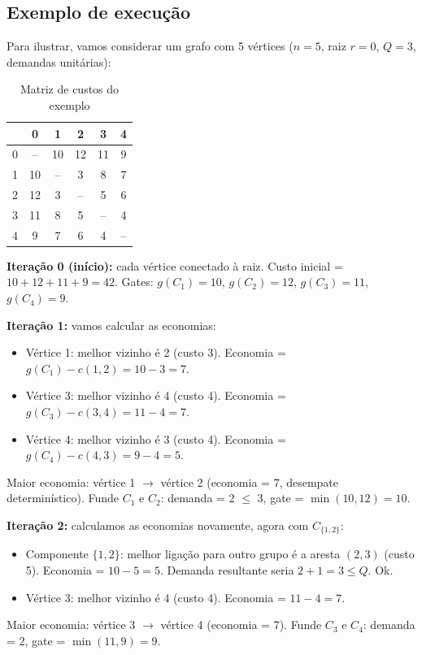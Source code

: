 \documentclass[12pt, a4paper]{article}
\begin{document}
\subsection{Exemplo de execução}

Para ilustrar, vamos considerar um grafo com 5 vértices ($n=5$, raiz $r=0$, $Q=3$, demandas unitárias):

\begin{table}[H]
\centering
\caption{Matriz de custos do exemplo}
\begin{tabular}{c|ccccc}
  & 0 & 1 & 2 & 3 & 4 \\ \hline
0 & -- & 10 & 12 & 11 & 9 \\
1 & 10 & -- & 3  & 8  & 7 \\
2 & 12 & 3  & -- & 5  & 6 \\
3 & 11 & 8  & 5  & -- & 4 \\
4 & 9  & 7  & 6  & 4  & --
\end{tabular}
\end{table}

\textbf{Iteração 0 (início):} cada vértice conectado à raiz.
Custo inicial = $10 + 12 + 11 + 9 = 42$. Gates: $g(C_1)=10$, $g(C_2)=12$, $g(C_3)=11$, $g(C_4)=9$.

\textbf{Iteração 1:} vamos calcular as economias:
\begin{itemize}
    \item Vértice 1: melhor vizinho é 2 (custo 3). Economia = $g(C_1) - c(1,2) = 10 - 3 = 7$.
    \item Vértice 3: melhor vizinho é 4 (custo 4). Economia = $g(C_3) - c(3,4) = 11 - 4 = 7$.
    \item Vértice 4: melhor vizinho é 3 (custo 4). Economia = $g(C_4) - c(4,3) = 9 - 4 = 5$.
\end{itemize}
Maior economia: vértice 1 $\to$ vértice 2 (economia = 7, desempate determinístico). Funde $C_1$ e $C_2$: demanda = 2 $\leq$ 3, gate = $\min(10, 12) = 10$.

\textbf{Iteração 2:} calculamos as economias novamente, agora com $C_{\{1,2\}}$:
\begin{itemize}
    \item Componente $\{1,2\}$: melhor ligação para outro grupo é a aresta $(2,3)$ (custo 5). Economia = $10 - 5 = 5$. Demanda resultante seria $2 + 1 = 3 \leq Q$. Ok.
    \item Vértice 3: melhor vizinho é 4 (custo 4). Economia = $11 - 4 = 7$.
\end{itemize}
Maior economia: vértice 3 $\to$ vértice 4 (economia = 7). Funde $C_3$ e $C_4$: demanda = 2, gate = $\min(11, 9) = 9$.
\end{document}
